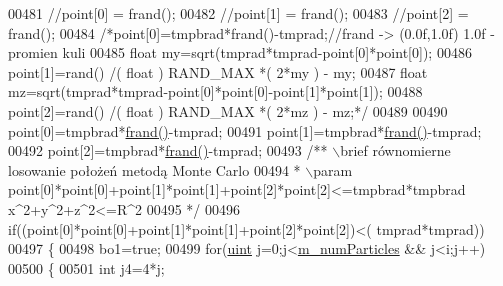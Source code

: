 \begin{DoxyCode}
{{{{{{00481                     \textcolor{comment}{//point[0] = frand();}
00482                     \textcolor{comment}{//point[1] = frand();}
00483                     \textcolor{comment}{//point[2] = frand();}
00484                                         \textcolor{comment}{/*point[0]=tmpbrad*frand()-tmprad;//frand -> (0.0f,1.0f) 1.0f
       - promien kuli}
00485 \textcolor{comment}{                                        float my=sqrt(tmprad*tmprad-point[0]*point[0]);}
00486 \textcolor{comment}{                                        point[1]=rand() /( float ) RAND\_MAX *( 2*my ) - my;}
00487 \textcolor{comment}{                                        float
       mz=sqrt(tmprad*tmprad-point[0]*point[0]-point[1]*point[1]);}
00488 \textcolor{comment}{                                        point[2]=rand() /( float ) RAND\_MAX *( 2*mz ) - mz;*/}
00489 
00490                                         point[0]=tmpbrad*\hyperlink{particle_system_8cpp_a5459f6b6b39f9a6b80de7f17c3777ee2}{frand}\hyperlink{particle_system_8cpp_a5459f6b6b39f9a6b80de7f17c3777ee2}{(}\hyperlink{particle_system_8cpp_a5459f6b6b39f9a6b80de7f17c3777ee2}{)}-tmprad;
00491                                         point[1]=tmpbrad*\hyperlink{particle_system_8cpp_a5459f6b6b39f9a6b80de7f17c3777ee2}{frand}\hyperlink{particle_system_8cpp_a5459f6b6b39f9a6b80de7f17c3777ee2}{(}\hyperlink{particle_system_8cpp_a5459f6b6b39f9a6b80de7f17c3777ee2}{)}-tmprad;
00492                                         point[2]=tmpbrad*\hyperlink{particle_system_8cpp_a5459f6b6b39f9a6b80de7f17c3777ee2}{frand}\hyperlink{particle_system_8cpp_a5459f6b6b39f9a6b80de7f17c3777ee2}{(}\hyperlink{particle_system_8cpp_a5459f6b6b39f9a6b80de7f17c3777ee2}{)}-tmprad;
00493                     \textcolor{comment}{/** \(\backslash\)brief równomierne losowanie położeń metodą Monte Carlo}
00494 \textcolor{comment}{                     * \(\backslash\)param point[0]*point[0]+point[1]*point[1]+point[2]*point[2]<=tmpbrad*tmpbrad
       x^2+y^2+z^2<=R^2}
00495 \textcolor{comment}{                     */}
00496                                         \textcolor{keywordflow}{if}((point[0]*point[0]+point[1]*point[1]+point[2]*point[2])<(
      tmprad*tmprad))
00497                     \{
00498                         bo1=\textcolor{keyword}{true};
00499                         \textcolor{keywordflow}{for}(\hyperlink{particles__kernel_8cuh_a91ad9478d81a7aaf2593e8d9c3d06a14}{uint} j=0;j<\hyperlink{class_particle_system_a23d238efa80a647d4b6cde034f486a91}{m\_numParticles} && j<i;j++)
00500                         \{
00501                                                         \textcolor{keywordtype}{int} j4=4*j;
}}}}}}
\end{DoxyCode}
